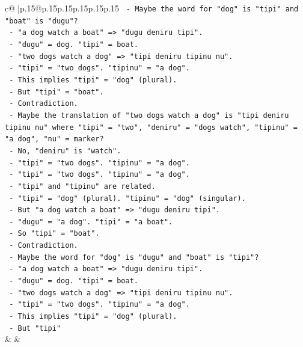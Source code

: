 \documentclass{article}
\begin{document}
{\begin{supertabular}{c@{$\;$}|p{.15\linewidth}@{}p{.15\linewidth}p{.15\linewidth}p{.15\linewidth}p{.15\linewidth}p{.15\linewidth}}
{{{\texttt{       {-} Maybe the word for "dog" is "tipi" and "boat" is "dugu"?} \\
\texttt{         {-} "a dog watch a boat" => "dugu deniru tipi".} \\
\texttt{           {-} "dugu" = dog. "tipi" = boat.} \\
\texttt{         {-} "two dogs watch a dog" => "tipi deniru tipinu nu".} \\
\texttt{           {-} "tipi" = "two dogs". "tipinu" = "a dog".} \\
\texttt{           {-} This implies "tipi" = "dog" (plural).} \\
\texttt{           {-} But "tipi" = "boat".} \\
\texttt{           {-} Contradiction.} \\
\texttt{       {-} Maybe the translation of "two dogs watch a dog" is "tipi deniru tipinu nu" where "tipi" = "two", "deniru" = "dogs watch", "tipinu" = "a dog", "nu" = marker?} \\
\texttt{         {-} No, "deniru" is "watch".} \\
\texttt{         {-} "tipi" = "two dogs". "tipinu" = "a dog".} \\
\texttt{         {-} "tipi" = "two dogs". "tipinu" = "a dog".} \\
\texttt{         {-} "tipi" and "tipinu" are related.} \\
\texttt{         {-} "tipi" = "dog" (plural). "tipinu" = "dog" (singular).} \\
\texttt{         {-} But "a dog watch a boat" => "dugu deniru tipi".} \\
\texttt{           {-} "dugu" = "a dog". "tipi" = "a boat".} \\
\texttt{           {-} So "tipi" = "boat".} \\
\texttt{           {-} Contradiction.} \\
\texttt{       {-} Maybe the word for "dog" is "dugu" and "boat" is "tipi"?} \\
\texttt{         {-} "a dog watch a boat" => "dugu deniru tipi".} \\
\texttt{           {-} "dugu" = dog. "tipi" = boat.} \\
\texttt{         {-} "two dogs watch a dog" => "tipi deniru tipinu nu".} \\
\texttt{           {-} "tipi" = "two dogs". "tipinu" = "a dog".} \\
\texttt{           {-} This implies "tipi" = "dog" (plural).} \\
\texttt{           {-} But "tipi"} \\
            }
        }
    }
    & & \\ \\


\end{supertabular}}
\end{document}
